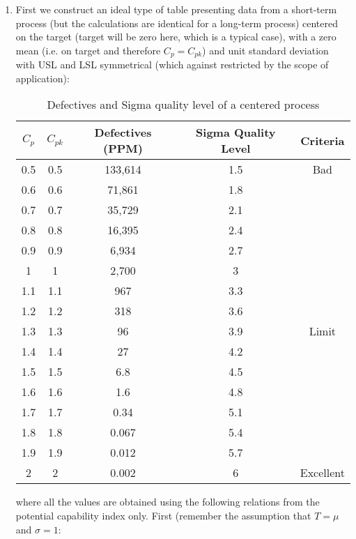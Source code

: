 	\begin{enumerate}
		\item First we construct an ideal type of table presenting data from a short-term process (but the calculations are identical for a long-term process) centered on the target (target will be zero here, which is a typical case), with a zero mean (i.e. on target and therefore $C_p=C_{pk}$) and unit standard deviation with USL and LSL symmetrical (which against restricted by the scope of application):
	\begin{table}[H]
	\begin{center}
			\begin{tabular}{|c|c|c|c|c|}
				\hline
				\multicolumn{1}{c}{\cellcolor{black!30}\textbf{$C_p$}} & 
\multicolumn{1}{c}{\cellcolor{black!30}\textbf{$C_{pk}$}} & \multicolumn{1}{c}{\cellcolor{black!30}\textbf{Defectives (PPM)}} & \multicolumn{1}{c}{\cellcolor{black!30}\textbf{Sigma Quality Level}}  & \multicolumn{1}{c}{\cellcolor{black!30}\textbf{Criteria}}\\ \hline
		0.5 & 0.5 & 133,614 & 1.5 & Bad\\ \hline
		0.6 & 0.6 & 71,861 & 1.8 & {}\\ \hline
		0.7 & 0.7 & 35,729 & 2.1 & {}\\ \hline
		0.8 & 0.8 & 16,395 & 2.4 & {}\\ \hline
		0.9 & 0.9 & 6,934 & 2.7 & {}\\ \hline
		1 & 1 & 2,700 & 3 &{}\\ \hline
		1.1 & 1.1 & 967 & 3.3 & {}\\ \hline
		1.2 & 1.2 & 318 & 3.6 & {}\\ \hline
		1.3 & 1.3 & 96 & 3.9 & Limit\\ \hline
		1.4 & 1.4 & 27 & 4.2 & {}\\ \hline
		1.5 & 1.5 & 6.8 & 4.5 & {}\\ \hline
		1.6 & 1.6 & 1.6 & 4.8 & {}\\ \hline
		1.7 & 1.7 & 0.34 & 5.1 & {}\\ \hline
		1.8 & 1.8 & 0.067 & 5.4 & {}\\ \hline
		1.9 & 1.9 & 0.012 & 5.7 & {}\\ \hline
		2 & 2 & 0.002 & 6 & Excellent \\ \hline
	\end{tabular}
	\end{center}
	\caption{Defectives and Sigma quality level of a centered process}
	\end{table}
		where all the values are obtained using the following relations from the potential capability index only. First (remember the assumption that $T=\mu$ and $\sigma=1$:
	

\end{enumerate}
